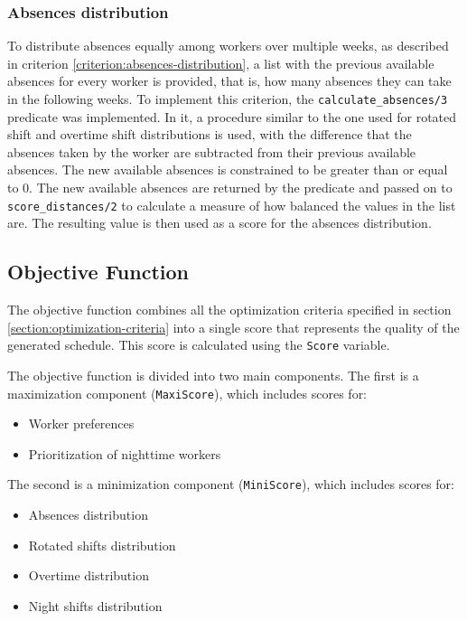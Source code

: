 \documentclass[conference]{IEEEtran}
\def\constraint#1{\vspace{4pt} {#1}}
\begin{document}
\constraint {
    \subsubsection*{Absences distribution}
    To distribute absences equally among workers over multiple weeks, as described in criterion \ref{criterion:absences-distribution}, a list with the previous available absences for every worker is provided, that is, how many absences they can take in the following weeks.
    To implement this criterion, the \texttt{calculate\_absences/3} predicate was implemented. In it, a procedure similar to the one used for rotated shift and overtime shift distributions is used, with the difference that the absences taken by the worker are subtracted from their previous available absences. The new available absences is constrained to be greater than or equal to 0. The new available absences are returned by the predicate and passed on to \texttt{score\_distances/2} to calculate a measure of how balanced the values in the list are. The resulting value is then used as a score for the absences distribution.
}

\subsection{Objective Function}
\label{section:objective-function}

The objective function combines all the optimization criteria specified in section \ref{section:optimization-criteria} into a single score that represents the quality of the generated schedule. This score is calculated using the \texttt{Score} variable.

The objective function is divided into two main components.
The first is a maximization component (\texttt{MaxiScore}), which includes scores for:

\begin{itemize}
    \item Worker preferences
    \item Prioritization of nighttime workers
\end{itemize}

The second is a minimization component (\texttt{MiniScore}), which includes scores for:

\begin{itemize}
    \item Absences distribution 
    \item Rotated shifts distribution
    \item Overtime distribution
    \item Night shifts distribution
\end{itemize}
\end{document}
